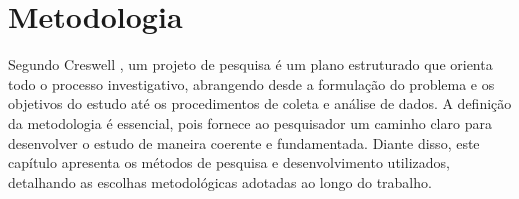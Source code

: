 \chapter{Metodologia}

Segundo Creswell \cite{creswell2021projeto}, um projeto de pesquisa é um plano
estruturado que orienta todo o processo investigativo, abrangendo desde a
formulação do problema e os objetivos do estudo até os procedimentos de coleta
e análise de dados. A definição da metodologia é essencial, pois fornece ao
pesquisador um caminho claro para desenvolver o estudo de maneira coerente e
fundamentada. Diante disso, este capítulo apresenta os métodos de pesquisa e
desenvolvimento utilizados, detalhando as escolhas metodológicas adotadas ao
longo do trabalho.




%
%

